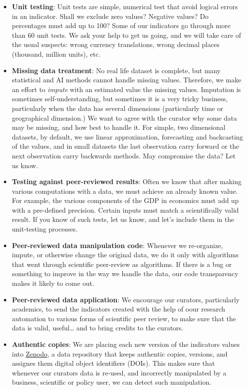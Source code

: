 \documentclass[
  a4paper,
  openany, a4paper, oneside]{book}
\begin{document}
\begin{itemize}
\item
  \textbf{Unit testing}: Unit tests are simple, numerical test that avoid logical errors in an indicator. Shall we exclude zero values? Negative values? Do percentages must add up to 100? Some of our indicators go through more than 60 unit tests. We ask your help to get us going, and we will take care of the usual suspects: wrong currency translations, wrong decimal places (thousand, million units), etc.
\item
  \textbf{Missing data treatment}: No real life dataset is complete, but many statistical and AI methods cannot handle missing values. Therefore, we make an effort to \emph{impute} with an estimated value the missing values. Imputation is sometimes self-understanding, but sometimes it is a very tricky business, particularly when the data has several dimensions (particularly time or geographical dimension.) We want to agree with the curator why some data may be missing, and how best to handle it. For simple, two dimensional datasets, by default, we use linear approximation, forecasting and backcasting of the values, and in small datasets the last observation carry forward or the next observation carry backwards methods. May compromise the data? Let us know.
\item
  \textbf{Testing against peer-reviewed results}: Often we know that after making various computations with a data, we must achieve an already known value. For example, the various components of the GDP in economics must add up with a pre-defined precision. Certain inputs must match a scientifically valid result. If you know of such tests, let us know, and let's include them in the unit-testing processes.
\item
  \textbf{Peer-reviewed data manipulation code}: Whenever we re-organize, impute, or otherwise change the original data, we do it only with algorithms that went through scientific peer-review as algorithms. If there is a bug or something to improve in the way we handle the data, our code transparency makes it likely to come out.
\item
  \textbf{Peer-reviewed data application}: We encourage our curators, particularly academics, to send the indicators created with the help of oour research automation to various forms of scientific peer review, to make sure that the data is valid, useful\ldots{} and to bring credits to the curators.
\item
  \textbf{Authentic copies}: We are placing each new version of the indicators values into \href{https://zenodo.org/}{Zenodo}, a data repository that keeps authentic copies, versions, and assignes them digital object identifiers (DOIs). This makes sure that whenever our curators data is re-used, and incorrectly manipulated by a business, scientific or policy user, we can detect such manipulation.
\end{itemize}
\end{document}
